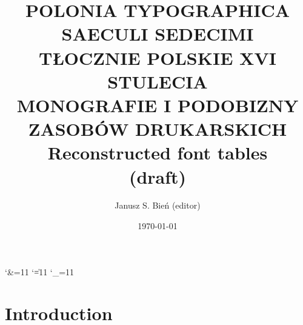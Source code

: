 \documentclass[12pt]{article}
\newcommand{\J}[1]{{\Junicode #1}}
\begin{document}


\title{POLONIA TYPOGRAPHICA
  SAECULI SEDECIMI\\
  { TŁOCZNIE POLSKIE XVI STULECIA\\ MONOGRAFIE I PODOBIZNY
    ZASOBÓW DRUKARSKICH}\\Reconstructed font tables\\
  (draft)}

\author{Janusz S. Bień (editor)}

\date{\today}

\maketitle

\catcode`\&=11
\catcode`\|=11
\catcode`\_=11

\def\apostrof{`}



\def\Hb#1{{\fontspec{Junicode}#1}}

\newcommand{\alfa}{\textit{alpha} (\J{α})}
\renewcommand{\alpha}{\textit{alpha} (\J{α})}
\renewcommand{\beta}{\textit{beta} (\J{β})}
\renewcommand{\delta}{\textit{delta} (\J{δ})}
\renewcommand{\epsilon}{\textit{epsilon} (\J{ε})}
\renewcommand{\eta}{\textit{eta} (\J{η})}
\renewcommand{\zeta}{\textit{zeta} (\J{ζ})}
\renewcommand{\theta}{\textit{theta} (\J{θ})}
\renewcommand{\gamma}{\textit{gamma} (\J{γ})}
\renewcommand{\chi}{\textit{chi} (\J{χ})}
\renewcommand{\kappa}{\textit{kappa} (\J{κ})}
\renewcommand{\iota}{\textit{iota} (\J{ι})}
\renewcommand{\lambda}{\textit{lambda} (\J{λ})}

\newpage

\section{Introduction}
\label{sec:introduction}

\end{document}
